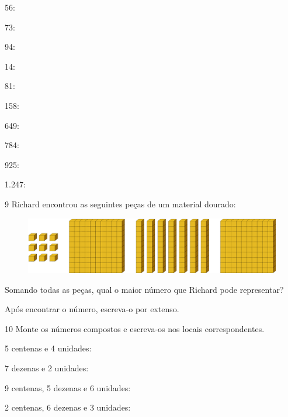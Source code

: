 \begin{escolha}
\item 56: 

\item 73: 

\item 94: 

\item 14: 

\item 81: 

\item 158: 

\item 649: 

\item 784: 

\item 925: 

\item 1.247: 
\end{escolha}

\num{9} Richard encontrou as seguintes peças de um material dourado:

\begin{figure}[htpb!]
\includegraphics[width=\textwidth]{./media/image4.png}
\end{figure}

Somando todas as peças, qual o maior número que Richard pode representar? 

Após encontrar o número, escreva-o por extenso.

\num{10} Monte os números compostos e escreva-os nos locais correspondentes.

\begin{escolha}
\item 5 centenas e 4 unidades:
\reduline{504\hfill}

\item 7 dezenas e 2 unidades:
\reduline{2\hfill}

\item 9 centenas, 5 dezenas e 6 unidades:
\reduline{956\hfill}

\item 2 centenas, 6 dezenas e 3 unidades:
\reduline{263\hfill}

\end{escolha}

